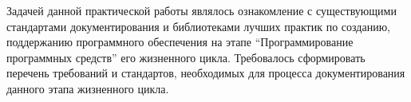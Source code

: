 
\pagebreak
{}

Задачей данной практической работы являлось ознакомление с существующими стандартами документирования и библиотеками лучших практик по созданию, поддержанию программного обеспечения на этапе \enquote{Программирование программных средств} его жизненного цикла.
Требовалось сформировать перечень требований и стандартов, необходимых для процесса документирования данного этапа жизненного цикла.
